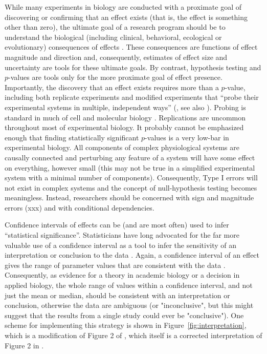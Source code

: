 \documentclass[fleqn,10pt,lineno]{wlpeerj} %
\begin{document}
While many experiments in biology are conducted with a proximate goal of discovering or confirming that an effect exists (that is, the effect is something other than zero), the ultimate goal of a research program should be to understand the biological (including clinical, behavioral, ecological or evolutionary) consequences of effects \citep{Yoccoz_Use_1991, Curran-Everett_Fundamental_1998, Nakagawa_Effect_2007, Batterham_Making_2006}. These consequences are functions of effect magnitude and direction and, consequently, estimates of effect size and uncertainty are tools for these ultimate goals. By contrast, hypothesis testing and $p$-values are tools only for the more proximate goal of effect presence. Importantly, the discovery that an effect exists requires more than a $p$-value, including both replicate experiments and modified experiments that ``probe their experimental systems in multiple, independent ways''  (\citealp{Vaux_Research_2012}, see also \citealt{Munafo_Robust_2018}). Probing is standard in much of cell and molecular biology \citep[but see][]{KaelinJr_Publish_2017}. Replications are uncommon throughout most of experimental biology. It probably cannot be emphasized enough that finding statistically significant $p$-values is a very low-bar in experimental biology. All components of complex physiological systems are causally connected and perturbing any feature of a system will have some effect on everything, however small (this may not be true in a simplified experimental system with a minimal number of components). Consequently, Type I errors will not exist in complex systems and the concept of null-hypothesis testing becomes meaningless. Instead, researchers should be concerned with sign and magnitude errors (xxx) and with conditional dependencies.

Confidence intervals of effects can be (and are most often) used to infer ``statistical significance''. Statisticians have long advocated for the far more valuable use of a confidence interval as a tool to infer the sensitivity of an interpretation or conclusion to the data \citep{Tukey_Philosophy_1991}. Again, a confidence interval of an effect gives the range of parameter values that are consistent with the data \citep{Amrhein_earth_2017b}. Consequently, as evidence for a theory in academic biology or a decision in applied biology, the whole range of values within a confidence interval, and not just the mean or median, should be consistent with an interpretation or conclusion, otherwise the data are ambiguous (or "inconclusive", but this might suggest that the results from a single study could ever be "conclusive"). One scheme for implementing this strategy is shown in Figure~\ref{fig:interpretation}, which is a modification of Figure 2 of \cite{Barker_Inference_2008}, which itself is a corrected interpretation of Figure 2 in \cite{Batterham_Making_2006}.
\end{document}

